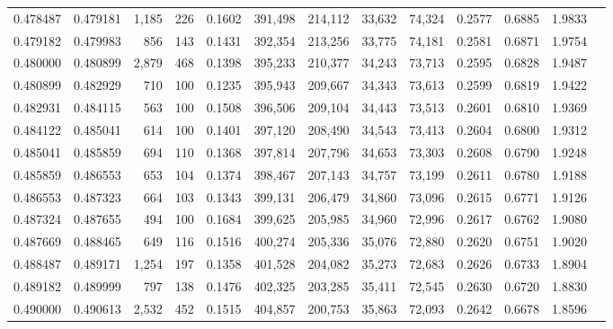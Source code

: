 \begin{tabular}{rrrrrrrrrrrrr}
0.478487 & 0.479181 & 1,185 & 226 &                                     0.1602 & 391,498 & 214,112 &  33,632 &  74,324 & 0.2577 & 0.6885 & 1.9833 \\
0.479182 & 0.479983 &   856 & 143 &                                     0.1431 & 392,354 & 213,256 &  33,775 &  74,181 & 0.2581 & 0.6871 & 1.9754 \\
0.480000 & 0.480899 & 2,879 & 468 &                                     0.1398 & 395,233 & 210,377 &  34,243 &  73,713 & 0.2595 & 0.6828 & 1.9487 \\
0.480899 & 0.482929 &   710 & 100 &                                     0.1235 & 395,943 & 209,667 &  34,343 &  73,613 & 0.2599 & 0.6819 & 1.9422 \\
0.482931 & 0.484115 &   563 & 100 &                                     0.1508 & 396,506 & 209,104 &  34,443 &  73,513 & 0.2601 & 0.6810 & 1.9369 \\
0.484122 & 0.485041 &   614 & 100 &                                     0.1401 & 397,120 & 208,490 &  34,543 &  73,413 & 0.2604 & 0.6800 & 1.9312 \\
0.485041 & 0.485859 &   694 & 110 &                                     0.1368 & 397,814 & 207,796 &  34,653 &  73,303 & 0.2608 & 0.6790 & 1.9248 \\
0.485859 & 0.486553 &   653 & 104 &                                     0.1374 & 398,467 & 207,143 &  34,757 &  73,199 & 0.2611 & 0.6780 & 1.9188 \\
0.486553 & 0.487323 &   664 & 103 &                                     0.1343 & 399,131 & 206,479 &  34,860 &  73,096 & 0.2615 & 0.6771 & 1.9126 \\
0.487324 & 0.487655 &   494 & 100 &                                     0.1684 & 399,625 & 205,985 &  34,960 &  72,996 & 0.2617 & 0.6762 & 1.9080 \\
0.487669 & 0.488465 &   649 & 116 &                                     0.1516 & 400,274 & 205,336 &  35,076 &  72,880 & 0.2620 & 0.6751 & 1.9020 \\
0.488487 & 0.489171 & 1,254 & 197 &                                     0.1358 & 401,528 & 204,082 &  35,273 &  72,683 & 0.2626 & 0.6733 & 1.8904 \\
0.489182 & 0.489999 &   797 & 138 &                                     0.1476 & 402,325 & 203,285 &  35,411 &  72,545 & 0.2630 & 0.6720 & 1.8830 \\
0.490000 & 0.490613 & 2,532 & 452 &                                     0.1515 & 404,857 & 200,753 &  35,863 &  72,093 & 0.2642 & 0.6678 & 1.8596 \\

\end{tabular}

